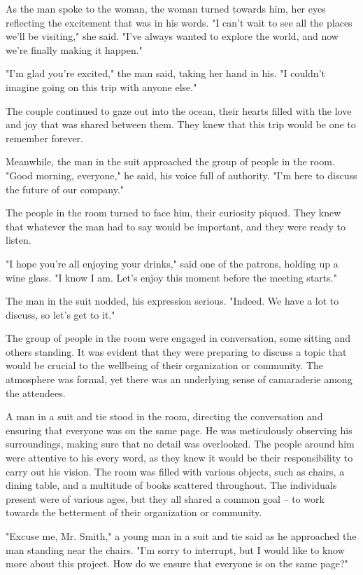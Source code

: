 \documentclass[smalldemyvopaper,11pt,twoside,onecolumn,openright,extrafontsizes]{memoir}
\begin{document}
As the man spoke to the woman, the woman turned towards him, her eyes reflecting the excitement that was in his words. "I can't wait to see all the places we'll be visiting," she said. "I've always wanted to explore the world, and now we're finally making it happen."\par
"I'm glad you're excited," the man said, taking her hand in his. "I couldn't imagine going on this trip with anyone else."\par
The couple continued to gaze out into the ocean, their hearts filled with the love and joy that was shared between them. They knew that this trip would be one to remember forever.\par
Meanwhile, the man in the suit approached the group of people in the room. "Good morning, everyone," he said, his voice full of authority. "I'm here to discuss the future of our company."\par
The people in the room turned to face him, their curiosity piqued. They knew that whatever the man had to say would be important, and they were ready to listen.\par
"I hope you're all enjoying your drinks," said one of the patrons, holding up a wine glass. "I know I am. Let's enjoy this moment before the meeting starts."\par
The man in the suit nodded, his expression serious. "Indeed. We have a lot to discuss, so let's get to it."\par
The group of people in the room were engaged in conversation, some sitting and others standing. It was evident that they were preparing to discuss a topic that would be crucial to the wellbeing of their organization or community. The atmosphere was formal, yet there was an underlying sense of camaraderie among the attendees.\par
A man in a suit and tie stood in the room, directing the conversation and ensuring that everyone was on the same page. He was meticulously observing his surroundings, making sure that no detail was overlooked. The people around him were attentive to his every word, as they knew it would be their responsibility to carry out his vision. The room was filled with various objects, such as chairs, a dining table, and a multitude of books scattered throughout. The individuals present were of various ages, but they all shared a common goal – to work towards the betterment of their organization or community.\par
"Excuse me, Mr. Smith," a young man in a suit and tie said as he approached the man standing near the chairs. "I'm sorry to interrupt, but I would like to know more about this project. How do we ensure that everyone is on the same page?"\par
\end{document}
